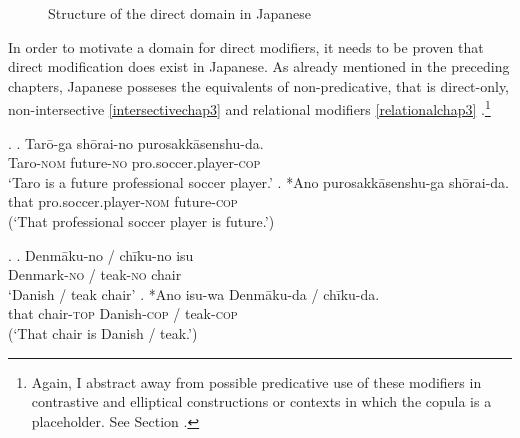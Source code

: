 \begin{figure}


 \caption{Structure of the direct domain in Japanese}
 \label{fig:Structure of the Direct Domain in Japanese1}
\end{figure}

In order to motivate a domain for direct modifiers, it needs to be proven that direct modification does exist in Japanese. As already mentioned in the preceding chapters, Japanese posseses the equivalents of non-predicative, that is direct-only, non-intersective \ref{intersectivechap3} and relational modifiers \ref{relationalchap3} \citep{yamakido:2005:nature, ayano:2010:revisiting, nagano:2016:are, watanabe:2017:attributive}.\footnote{Again, I abstract away from possible predicative use of these modifiers in contrastive and elliptical constructions or contexts in which the copula is a placeholder. See Section .}

\ex. \label{intersectivechap3} \ag. Tarō-ga shōrai-no purosakkāsenshu-da.\\
Taro-\textsc{nom} future-\textsc{no} pro.soccer.player-\textsc{cop}\\
`Taro is a future professional soccer player.’
\bg. *Ano purosakkāsenshu-ga shōrai-da.\\
that pro.soccer.player-\textsc{nom} future-\textsc{cop}\\
(`That professional soccer player is future.’)

\ex. \label{relationalchap3} \ag. Denmāku-no / chīku-no isu\\
Denmark-\textsc{no} / teak-\textsc{no} chair\\
`Danish / teak chair'
\bg. *Ano isu-wa Denmāku-da / chīku-da.\\
that chair-\textsc{top} Danish-\textsc{cop} / teak-\textsc{cop}\\
(`That chair is Danish / teak.’)

